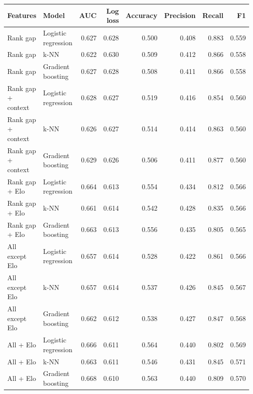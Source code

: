 \begin{tabular}{llrrrrrr}
\toprule
Features & Model & AUC & Log loss & Accuracy & Precision & Recall & F1 \\
\midrule
Rank gap & Logistic regression & 0.627 & 0.628 & 0.500 & 0.408 & 0.883 & 0.559 \\
Rank gap & k-NN & 0.622 & 0.630 & 0.509 & 0.412 & 0.866 & 0.558 \\
Rank gap & Gradient boosting & 0.627 & 0.628 & 0.508 & 0.411 & 0.866 & 0.558 \\
Rank gap + context & Logistic regression & 0.628 & 0.627 & 0.519 & 0.416 & 0.854 & 0.560 \\
Rank gap + context & k-NN & 0.626 & 0.627 & 0.514 & 0.414 & 0.863 & 0.560 \\
Rank gap + context & Gradient boosting & 0.629 & 0.626 & 0.506 & 0.411 & 0.877 & 0.560 \\
Rank gap + Elo & Logistic regression & 0.664 & 0.613 & 0.554 & 0.434 & 0.812 & 0.566 \\
Rank gap + Elo & k-NN & 0.661 & 0.614 & 0.542 & 0.428 & 0.835 & 0.566 \\
Rank gap + Elo & Gradient boosting & 0.663 & 0.613 & 0.556 & 0.435 & 0.805 & 0.565 \\
All except Elo & Logistic regression & 0.657 & 0.614 & 0.528 & 0.422 & 0.861 & 0.566 \\
All except Elo & k-NN & 0.657 & 0.614 & 0.537 & 0.426 & 0.845 & 0.567 \\
All except Elo & Gradient boosting & 0.662 & 0.612 & 0.538 & 0.427 & 0.847 & 0.568 \\
All + Elo & Logistic regression & 0.666 & 0.611 & 0.564 & 0.440 & 0.802 & 0.569 \\
All + Elo & k-NN & 0.663 & 0.611 & 0.546 & 0.431 & 0.845 & 0.571 \\
All + Elo & Gradient boosting & 0.668 & 0.610 & 0.563 & 0.440 & 0.809 & 0.570 \\
\bottomrule
\end{tabular}
